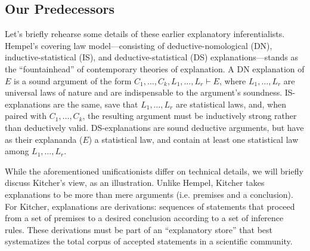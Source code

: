 \documentclass{svjour3}                     %
\begin{document}
\subsection{Our Predecessors}
\label{subsec:predecessors}
Let's briefly rehearse some details of these earlier explanatory inferentialists. Hempel's covering law model---consisting of deductive-nomological (DN), inductive-statistical (IS), and deductive-statistical (DS) explanations---stands as the ``fountainhead'' of contemporary theories of explanation. A DN explanation of $E$ is a sound argument of the form $C_1, \dots, C_k, L_1, \dots, L_r  \vdash E$, where $L_1, \dots, L_r$ are universal laws of nature and are indispensable to the argument's soundness. IS-explanations are the same, save that $L_1, \dots, L_r$ are statistical laws, and, when paired with $C_1, \dots, C_k$, the resulting argument must be inductively strong rather than deductively valid. DS-explanations are sound deductive arguments, but have as their explananda ($E$) a statistical law, and contain at least one statistical law among $L_1, \dots, L_r$. 

While the aforementioned unificationists differ on technical details, we will briefly discuss Kitcher's view, as an illustration. Unlike Hempel, Kitcher takes explanations to be more than mere arguments (i.e. premises and a conclusion). For Kitcher, explanations are derivations: sequences of statements that proceed from a set of premises to a desired conclusion according to a set of inference rules. These derivations must be part of an ``explanatory store'' that best systematizes the total corpus of accepted statements in a scientific community. 
\end{document}
